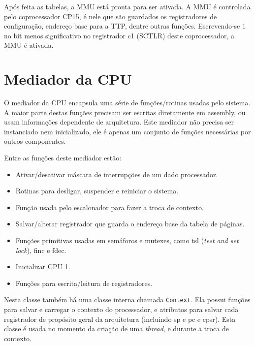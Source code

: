 Após feita as tabelas, a MMU está pronta para ser ativada. A MMU é controlada pelo coprocessador CP15, é nele que são guardados os registradores de configuração, endereço base para a TTP, dentre outras funções. Escrevendo-se 1 no bit menos significativo no registrador c1 (SCTLR) deste coprocessador, a MMU é ativada.


\section{Mediador da CPU}

O mediador da CPU encapsula uma série de funções/rotinas usadas pelo sistema. A maior parte destas funções precisam ser escritas diretamente em assembly, ou usam informações dependente de arquitetura. Este mediador não precisa ser instanciado nem inicializado, ele é apenas um conjunto de funções necessárias por outros componentes.

Entre as funções deste mediador estão:

\begin{itemize}

\item Ativar/desativar máscara de interrupções de um dado processador.
\item Rotinas para desligar, suspender e reiniciar o sistema.
\item Função usada pelo escalonador para fazer a troca de contexto.
\item Salvar/alterar registrador que guarda o endereço base da tabela de páginas.
\item Funções primitivas usadas em semáforos e mutexes, como tsl (\emph{test and set lock}), finc e fdec.
\item Inicializar CPU 1.
\item Funções para escrita/leitura de registradores.

\end{itemize}


Nesta classe também há uma classe interna chamada \verb+Context+. Ela possui funções para salvar e carregar o contexto do processador, e atributos para salvar cada registrador de propósito geral da arquitetura (incluindo sp e pc e cpsr). Esta classe é usada no momento da criação de uma \emph{thread}, e durante a troca de contexto.




